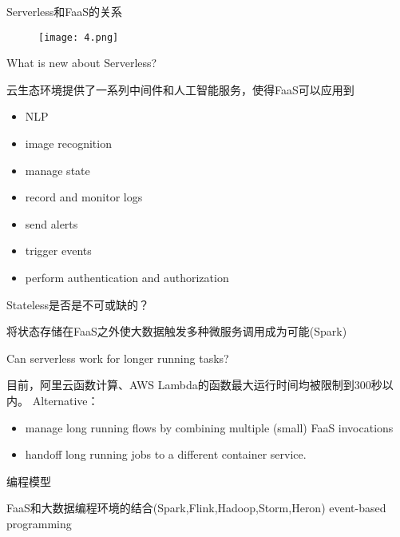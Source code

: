 \documentclass{beamer}
\begin{document}
    \begin{frame}Serverless和FaaS的关系
    	\begin{figure}
    		\centering
    		\texttt{[image: 4.png]}
    	\end{figure}
    \end{frame}

    \begin{frame}What is new about Serverless?
    	
        云生态环境提供了一系列中间件和人工智能服务，使得FaaS可以应用到
        \begin{itemize}
        	\item NLP
        	\item image recognition
        	\item manage state
        	\item record and monitor logs
        	\item send alerts
        	\item trigger events
        	\item perform authentication and authorization
        \end{itemize}
    \end{frame}

    \begin{frame}Stateless是否是不可或缺的？
    	
        将状态存储在FaaS之外使大数据触发多种微服务调用成为可能(Spark)
    \end{frame}
    
    \begin{frame}Can serverless work for longer running tasks?
    	
        目前，阿里云函数计算、AWS Lambda的函数最大运行时间均被限制到300秒以内。
        Alternative：
        \begin{itemize}
        	\item manage long running flows by combining multiple (small) FaaS invocations
        	\item handoff long running jobs to a different container service.
        \end{itemize}
    \end{frame}

    \begin{frame}编程模型
    	
        FaaS和大数据编程环境的结合(Spark,Flink,Hadoop,Storm,Heron)
        event-based programming
    \end{frame}
    
\end{document}
